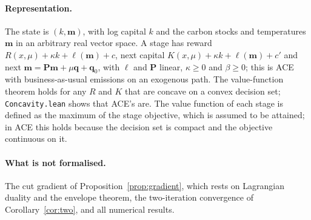 \paragraph{Representation.} The state is $(k, \bm{m})$, with log capital $k$ and the carbon stocks and temperatures $\bm{m}$ in an arbitrary real vector space. A stage has reward $R(x,\mu) + \kappa k + \ell(\bm{m}) + c$, next capital $K(x,\mu) + \kappa k + \ell(\bm{m}) + c'$ and next $\bm{m} = \bm{P}\bm{m} + \mu \bm{q} + \bm{q}_0$, with $\ell$ and $\bm{P}$ linear, $\kappa \ge 0$ and $\beta \ge 0$; this is ACE with business-as-usual emissions on an exogenous path. The value-function theorem holds for any $R$ and $K$ that are concave on a convex decision set; \texttt{Concavity.lean} shows that ACE's are. The value function of each stage is defined as the maximum of the stage objective, which is assumed to be attained; in ACE this holds because the decision set is compact and the objective continuous on it.

\paragraph{What is not formalised.} The cut gradient of Proposition~\ref{prop:gradient}, which rests on Lagrangian duality and the envelope theorem, the two-iteration convergence of Corollary~\ref{cor:two}, and all numerical results.
